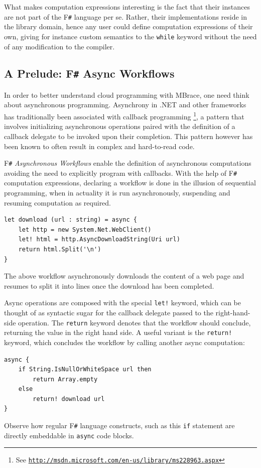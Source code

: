 \documentclass[9pt,a4paper]{article}
\newcommand{\mbrace}{MBrace}
\newcommand{\fsharp}{F\texttt \#}
\newcommand{\samehref}[1]{\href{#1}{\texttt{#1}}}
\begin{document}
What makes computation expressions interesting is the fact that their instances
are not part of the \fsharp{} language per se. Rather, their implementations
reside in the library domain, hence any user could define computation expressions
of their own, giving for instance custom semantics to the \texttt{while} keyword 
without the need of any modification to the compiler\cite{fsharp-compexpr}.

\subsection{A Prelude: \fsharp{} Async Workflows}

In order to better understand cloud programming with \mbrace{}, 
one need think about asynchronous programming. 
Asynchrony in .NET and other frameworks has traditionally been 
associated with callback programming%
\footnote{See \samehref{http://msdn.microsoft.com/en-us/library/ms228963.aspx}}, 
a pattern that involves initializing asynchronous operations paired with the definition 
of a callback delegate to be invoked upon their completion.
This pattern however has been known to often result in complex and hard-to-read code.

\fsharp{} \emph{Asynchronous Workflows} enable the definition of asynchronous 
computations avoiding the need to explicitly program with callbacks\cite{fsharp-async}. 
With the help of \fsharp{} computation expressions, 
declaring a workflow is done in the illusion of sequential programming, 
when in actuality it is run asynchronously, 
suspending and resuming computation as required.
\begin{lstlisting}
let download (url : string) = async {
    let http = new System.Net.WebClient()
    let! html = http.AsyncDownloadString(Uri url)
    return html.Split('\n')
}
\end{lstlisting}
The above workflow asynchronously downloads the content of a web page 
and resumes to split it into lines once the download has been completed.

Async operations are composed with the special \texttt{let!} keyword, 
which can be thought of as syntactic sugar for the callback delegate passed
to the right-hand-side operation.
The \texttt{return} keyword denotes that the workflow should conclude, returning 
the value in the right hand side. A useful variant is the \texttt{return!} keyword, 
which concludes the workflow by calling another async computation:
\begin{lstlisting}
async {
    if String.IsNullOrWhiteSpace url then
        return Array.empty
    else
        return! download url
}
\end{lstlisting}
Observe how regular \fsharp{} language constructs, such as this \texttt{if} statement
are directly embeddable in \texttt{async} code blocks.
\end{document}
